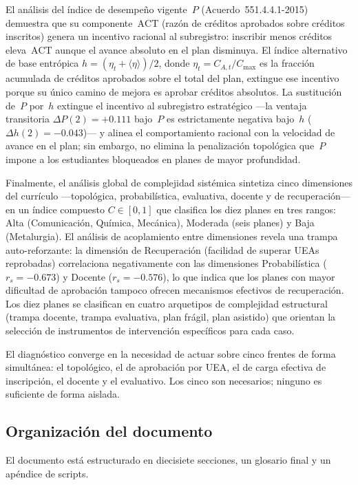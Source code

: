 \documentclass[11pt,letterpaper]{article}
\begin{document}
El análisis del índice de desempeño vigente~$P$ (Acuerdo~551.4.4.1-2015)
demuestra que su componente~$\mathrm{ACT}$ (razón de créditos aprobados sobre
créditos inscritos) genera un incentivo racional al subregistro: inscribir menos
créditos eleva~$\mathrm{ACT}$ aunque el avance absoluto en el plan disminuya.
El índice alternativo de base entrópica $h=(\eta_t+\langle\eta\rangle)/2$,
donde $\eta_t=C_{A,t}/C_{\max}$ es la fracción acumulada de créditos aprobados
sobre el total del plan, extingue ese incentivo porque su único camino de mejora
es aprobar créditos absolutos.
La sustitución de~$P$ por~$h$ extingue el incentivo al subregistro estratégico
---la ventaja transitoria $\Delta P(2)=+0.111$ bajo~$P$ es estrictamente negativa
bajo~$h$ ($\Delta h(2)=-0.043$)--- y alinea el comportamiento racional con la
velocidad de avance en el plan; sin embargo, no elimina la penalización topológica
que~$P$ impone a los estudiantes bloqueados en planes de mayor profundidad.

Finalmente, el análisis global de complejidad sistémica sintetiza cinco
dimensiones del currículo ---topológica, probabilística, evaluativa, docente
y de recuperación--- en un índice compuesto $C\in[0,1]$ que clasifica los
diez planes en tres rangos: Alta (Comunicación, Química, Mecánica), Moderada
(seis planes) y Baja (Metalurgia).
El análisis de acoplamiento entre dimensiones revela una trampa auto-reforzante:
la dimensión de Recuperación (facilidad de superar UEAs reprobadas) correlaciona
negativamente con las dimensiones Probabilística ($r_s=-0.673$) y Docente
($r_s=-0.576$), lo que indica que los planes con mayor dificultad de aprobación
tampoco ofrecen mecanismos efectivos de recuperación.
Los diez planes se clasifican en cuatro arquetipos de complejidad estructural
(trampa docente, trampa evaluativa, plan frágil, plan asistido) que orientan
la selección de instrumentos de intervención específicos para cada caso.

El diagnóstico converge en la necesidad de actuar sobre cinco frentes de forma
simultánea: el topológico, el de aprobación por UEA, el de carga efectiva de
inscripción, el docente y el evaluativo.
Los cinco son necesarios; ninguno es suficiente de forma aislada.

\subsection{Organización del documento}

El documento está estructurado en diecisiete secciones, un glosario final
y un apéndice de scripts.
\end{document}
